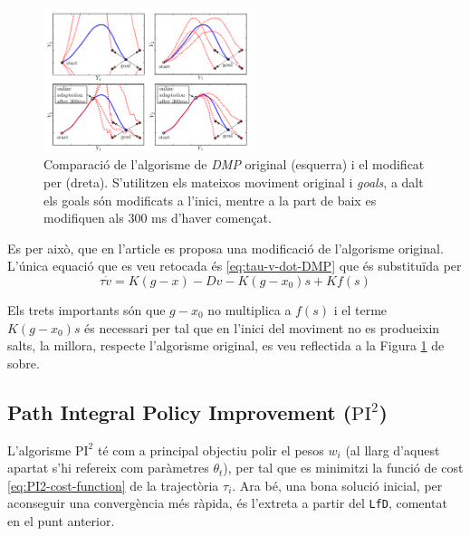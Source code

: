 \documentclass[12pt,a4paper,final,twoside]{report}
\begin{document}
\begin{figure}
\centering
\includegraphics[width=0.55\textwidth]{Imatges/DMP-modified-algorism.png}
\caption[Comparació de l'algorisme de \textit{DMP} original (esquerra) i el modificat  per \cite{Pastor2009} (dreta)]{Comparació de l'algorisme de \textit{DMP} original (esquerra) i el modificat  per \cite{Pastor2009} (dreta). S'utilitzen els mateixos moviment original i \textit{goals}, a dalt els goals són modificats a l'inici, mentre a la part de baix es modifiquen als 300 ms d'haver començat.}
\label{fig:DMP-modified-algorism}
\end{figure}

Es per això, que en l'article \cite{Pastor2009} es proposa una modificació de l'algorisme original. L'única equació que es veu retocada és \eqref{eq:tau-v-dot-DMP} que és substituïda per
\begin{equation}\label{eq:tau-v-dot-DMP-modified}
\tau \dot{v} = K(g - x) - Dv - K(g - x_0)s + K f(s)
\end{equation}

Els trets importants són que $g - x_0$ no multiplica a $f(s)$ i el terme $K(g - x_0)s$ és necessari per tal que en l'inici del moviment no es produeixin salts, la millora, respecte l'algorisme original, es veu reflectida a la Figura \ref{fig:DMP-modified-algorism} de sobre.


\subsection{\textbf{P}ath \textbf{I}ntegral \textbf{P}olicy \textbf{I}mprovement ($\mathrm{PI^2}$)}
\label{PI2-estat-de-l'art}

L'algorisme $\mathrm{PI^2}$ \cite{Stulp2011} té com a principal objectiu polir el pesos $w_i$ (al llarg d'aquest apartat s'hi refereix com paràmetres $\theta_t$), per tal que es minimitzi la funció de cost \eqref{eq:PI2-cost-function} de la trajectòria $\tau_i$. Ara bé, una bona solució inicial, per aconseguir una convergència més ràpida, és l'extreta a partir del \texttt{LfD}, comentat en el punt anterior.
\end{document}
